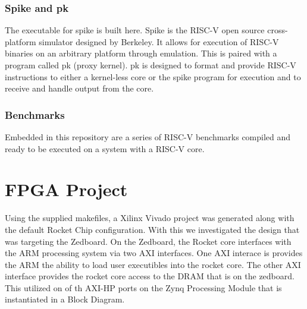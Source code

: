 \documentclass[journal]{IEEEtran}
\begin{document}
\subsubsection{Spike and pk}
The executable for spike is built here. Spike is the RISC-V open source cross-platform simulator designed by Berkeley. It allows for execution of RISC-V binaries on an arbitrary platform through emulation. This is paired with a program called pk (proxy kernel). pk is designed to format and provide RISC-V instructions to either a kernel-less core or the spike program for execution and to receive and handle output from the core. \newline

\subsubsection{Benchmarks}

Embedded in this repository are a series of RISC-V benchmarks compiled and ready to be executed on a system with a RISC-V core. 

\section{FPGA Project}
Using the supplied makefiles, a Xilinx Vivado project was generated along with the default Rocket Chip configuration. With this we investigated the design that was targeting the Zedboard.
On the Zedboard, the Rocket core interfaces with the ARM processing system via two AXI interfaces. One AXI interace is provides the ARM the ability to load user executibles into the rocket core. The other AXI interface provides the rocket core access to the DRAM that is on the zedboard. This utilized on of th AXI-HP ports on the Zynq Processing Module that is instantiated in a Block Diagram.
\end{document}
